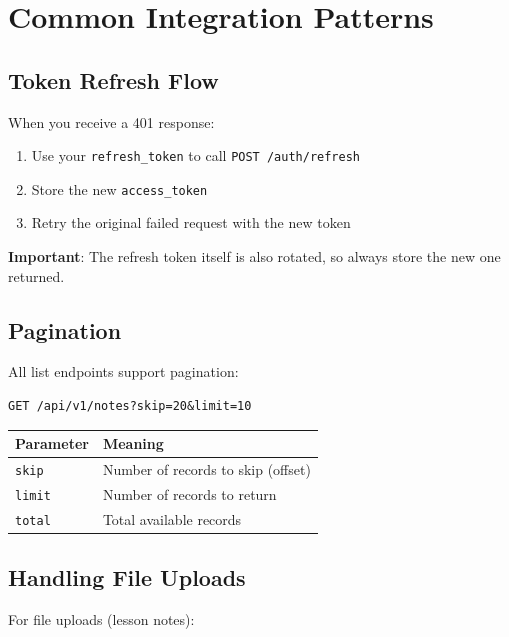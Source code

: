 \documentclass[12pt,a4paper,oneside]{article}
\begin{document}
\section{Common Integration Patterns}

\subsection{Token Refresh Flow}

When you receive a 401 response:

\begin{enumerate}
    \item Use your \texttt{refresh\_token} to call \texttt{POST /auth/refresh}
    \item Store the new \texttt{access\_token}
    \item Retry the original failed request with the new token
\end{enumerate}

\textbf{Important}: The refresh token itself is also rotated, so always store the new one returned.

\subsection{Pagination}

All list endpoints support pagination:

\begin{lstlisting}
GET /api/v1/notes?skip=20&limit=10
\end{lstlisting}

\begin{table}[H]
\centering
\small
\begin{tabular}{|l|l|}
\hline
\textbf{Parameter} & \textbf{Meaning} \\
\hline
\texttt{skip} & Number of records to skip (offset) \\
\hline
\texttt{limit} & Number of records to return \\
\hline
\texttt{total} & Total available records \\
\hline
\end{tabular}
\end{table}

\subsection{Handling File Uploads}

For file uploads (lesson notes):
\end{document}
